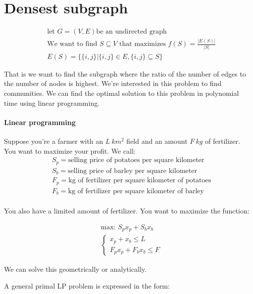 \documentclass[]{article}
\begin{document}
\section{Densest subgraph}

\begin{align*}
&\text{let } G= (V,E) \text{be an undirected graph}\\
&\text{We want to find } S \subseteq V \text{ that maximizes } f(S) = \frac{|E(S)|}{|S|}\\
&E(S) = \{ \{i, j\} | \{i, j\} \in E, \{i, j\} \subseteq S \}
\end{align*}

That is we want to find the subgraph where the ratio of the number of edges to the number of nodes is highest. We're interested in this problem to find communities. We can find the optimal solution to this problem in polynomial time using linear programming.

\paragraph{Linear programming}
Suppose you're a farmer with an $L\ km^2$ field and an amount $F\ kg$ of fertilizer. You want to maximize your profit. We call:
\begin{align*}
&S_p = \text{selling price of potatoes per square kilometer}\\
&S_b = \text{selling price of barley per square kilometer}\\
&F_p = \text{kg of fertilizer per square kilometer of potatoes}\\
&F_b = \text{kg of fertilizer per square kilometer of barley}\\
\end{align*}

You also have a limited amount of fertilizer. You want to maximize the function:

\begin{align*}
	&\text{max: } S_p x_p + S_b x_b\\
	&\begin{cases}
	x_p + x_b \leq L\\
	F_p x_p + F_b x_b \leq F
	\end{cases}
\end{align*}

We can solve this geometrically or analytically.

A general primal LP problem is expressed in the form:
\end{document}
